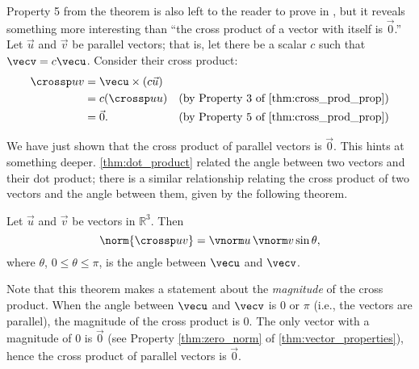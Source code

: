 Property 5 from the theorem is also left to the reader to prove in , but it reveals something more interesting than ``the cross product of a vector with itself is $\vec 0$.'' Let $\vec u$ and $\vec v$ be parallel vectors; that is, let there be a scalar $c$ such that $\vecv = c\vecu$. Consider their cross product:
\begin{align*}
	\crossp uv
	&= \vecu \times (c\vec u) \\
	&= c(\crossp uu) & \text{(by Property 3 of \autoref{thm:cross_prod_prop})} \\
	&= \vec 0. & \text{(by Property 5 of \autoref{thm:cross_prod_prop})}
\end{align*}

We have just shown that the cross product of parallel vectors is $\vec 0$. This hints at something deeper. \autoref{thm:dot_product} related the angle between two vectors and their dot product; there is a similar relationship relating the cross product of two vectors and the angle between them, given by the following theorem.

\begin{theorem}\label{thm:cross_product}
Let $\vec u$ and $\vec v$ be vectors in $\mathbb{R}^3$. Then
\[\norm{\crossp uv} = \vnorm u\, \vnorm v \sin\theta,\]
where $\theta$, $0\leq \theta \leq \pi$, is the angle between $\vecu$ and $\vecv$.
\end{theorem}


Note that this theorem makes a statement about the \emph{magnitude} of the cross product. When the angle between $\vecu$ and $\vecv$ is 0 or $\pi$ (i.e., the vectors are parallel), the magnitude of the cross product is 0. The only vector with a magnitude of 0 is $\vec 0$ (see Property \ref{thm:zero_norm} of \autoref{thm:vector_properties}), hence the cross product of  parallel vectors is $\vec 0$.\bigskip

